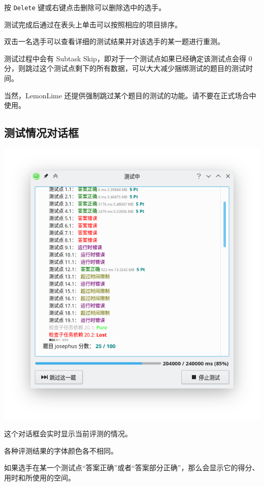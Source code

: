 \documentclass[UTF-8]{ctexart}
\begin{document}
		按 \texttt{Delete} 键或右键点击删除可以删除选中的选手。
		
		测试完成后通过在表头上单击可以按照相应的项目排序。
		
		双击一名选手可以查看详细的测试结果并对该选手的某一题进行重测。
		
		测试过程中会有 Subtask Skip，即对于一个测试点如果已经确定该测试点会得 0 分，则跳过这个测试点剩下的所有数据，可以大大减少捆绑测试的题目的测试时间。
		
		当然，LemonLime 还提供强制跳过某个题目的测试的功能。请不要在正式场合中使用。
		
		\subsection{测试情况对话框}
		
			\begin{center}
			\includegraphics[scale=0.4]{pics/judgingdialog.png}
			\end{center}
		
			这个对话框会实时显示当前评测的情况。
			
			各种评测结果的字体颜色各不相同。
			
			如果选手在某一个测试点“答案正确”或者“答案部分正确”，那么会显示它的得分、用时和所使用的空间。
			
\end{document}
